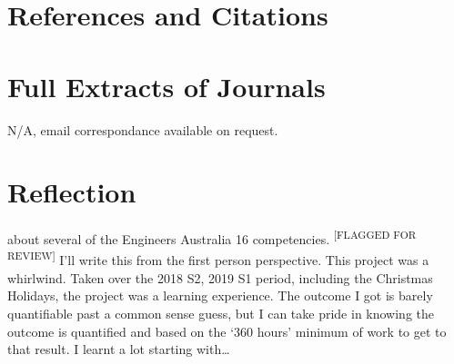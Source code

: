 \documentclass{UoNMCHA}
\newcommand{\flagforreview}{\textsuperscript{\color{red} [FLAGGED FOR REVIEW]}}
\numberwithin{equation}{section}
\begin{document}
%
%
%
%
\section{References and Citations}\label{sec:RefCite}

 


\newpage
\appendix
\section{Full Extracts of Journals}
N/A, email correspondance available on request.

\section{Reflection}
about several of the Engineers Australia 16 competencies.  \flagforreview
I'll write this from the first person perspective.
This project was a whirlwind. Taken over the 2018 S2, 2019 S1 period, including the Christmas Holidays, the project was a learning experience. The outcome I got is barely quantifiable past a common sense guess, but I can take pride in knowing the outcome is quantified and based on the `360 hours' minimum of work to get to that result. I learnt a lot starting with\dots
\end{document}

